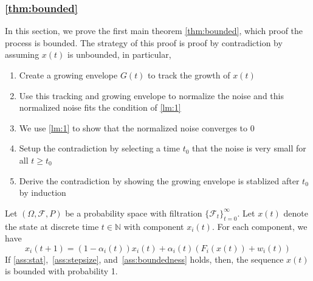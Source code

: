 \subsubsection{\autoref{thm:bounded}}
In this section, we prove the first main theorem \autoref{thm:bounded}, which proof the process is bounded.  The strategy of this proof is proof by contradiction by assuming $x(t)$ is unbounded, in particular,
\begin{enumerate}
    \item Create a growing envelope $G(t)$ to track the growth of $x(t)$
    \item Use this tracking and growing envelope to normalize the noise and this normalized noise fits the condition of \autoref{lm:1}
    \item We use \autoref{lm:1} to show that the normalized noise converges to 0
    \item Setup the contradiction by selecting a time $t_0$ that the noise is very small for all $t\ge t_0$
    \item Derive the contradiction by showing the growing envelope is stablized after $t_0$ by induction
\end{enumerate}
\begin{theorem}\label{thm:bounded}
Let $(\Omega, \mathcal{F},P)$ be a probability space with filtration $\{\mathcal{F}_t\}_{t=0}^\infty$. Let $x(t)$ denote the state at discrete time $t\in\mathbb{N}$ with component $x_i(t)$. For each component, we have
$$
x_i(t+1) = (1-\alpha_i(t))x_i(t) + \alpha_i(t)(F_i(x(t)) + w_i(t)) 
$$
If \autoref{ass:stat},~\ref{ass:stepsize}, and~\ref{ass:boundedness} holds, then, the sequence $x(t)$ is bounded with probability 1.

\end{theorem}
